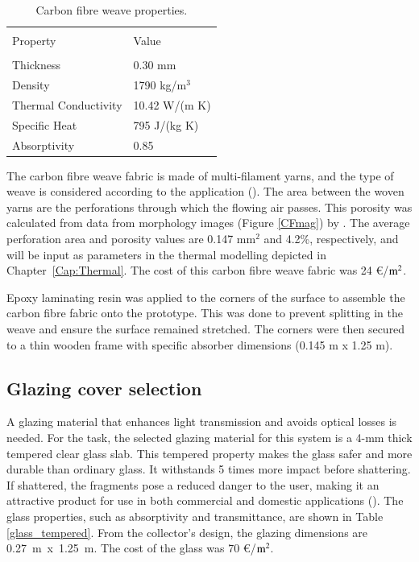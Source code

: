 \begin{table}[!ht]
	\caption{Carbon fibre weave properties.}
	\centering
	\begin{tabular}{p{5cm}p{4cm}}
		\hline \\[-12pt] 
		Property & Value \\ 
		\hline \\[-12pt] 
		Thickness & 0.30 mm \\ [3pt]
		Density & 1790 kg/m$^3$ \\ [3pt]
		Thermal Conductivity & 10.42 W/(m K) \\ [3pt]
		Specific Heat & 795 J/(kg K) \\ [3pt]
		Absorptivity & 0.85 \\ [1pt]
		\hline 
	\end{tabular} 
	\label{carbonfiber}
\end{table}

The carbon fibre weave fabric is made of multi-filament yarns, and the type of weave is considered according to the application (\cite{Tourlonias2016}). The area between the woven yarns are the perforations through which the flowing air passes. This porosity was calculated from data from morphology images (Figure \ref{CFmag}) by \citet{Shams2013}. The average perforation area and porosity values are 0.147 mm$^2$ and 4.2\%, respectively, and will be input as parameters in the thermal modelling depicted in \mbox{Chapter \ref{Cap:Thermal}}. The cost of this carbon fibre weave fabric was 24 \euro/${\rm m^2}$.


Epoxy laminating resin was applied to the corners of the surface to assemble the carbon fibre fabric onto the prototype. This was done to prevent splitting in the weave and ensure the surface remained stretched. The corners were then secured to a thin wooden frame with specific absorber dimensions (0.145 m x 1.25 m).

\subsection{Glazing cover selection}

A glazing material that enhances light transmission and avoids optical losses is needed. For the task, the selected glazing material for this system is a 4-mm thick tempered clear glass slab. This tempered property makes the glass safer and more durable than ordinary glass. It withstands 5 times more impact before shattering. If shattered, the fragments pose a reduced danger to the user, making it an attractive product for use in both commercial and domestic applications (\cite{FirstGlass2016}). The glass properties, such as absorptivity and transmittance, are shown in Table \ref{glass_tempered}. From the collector's design, the glazing dimensions are \mbox{0.27 m x 1.25 m}. The cost of the glass was 70 \euro/${\rm m^2}$.

